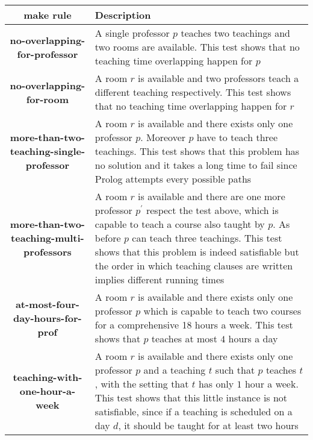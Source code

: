 \documentclass[10pt,a4paper]{article} %
\begin{document}
    \begin{table}
        \begin{tabular}{ c | p{6cm} }
            make rule & Description  \\
            \hline
            \textbf{no-overlapping-for-professor} & A single professor $p$
                teaches two teachings and two rooms are available.
                This test shows that no teaching time overlapping happen for $p$ \\
            \hline
            \textbf{no-overlapping-for-room} & A room $r$ is available and two
                professors teach a different teaching respectively.
                This test shows that no teaching time overlapping happen for $r$  \\
            \hline
            \textbf{more-than-two-teaching-single-professor} & A room $r$ is available and
                there exists only one professor $p$. Moreover $p$ have to teach three teachings.
                This test shows that this problem has no solution and it takes
                a long time to fail since Prolog attempts every possible paths \\
            \hline
            \textbf{more-than-two-teaching-multi-professors} & A room $r$ is available and
                there are one more professor $p^\prime$ respect the test above,
                which is capable to teach a course also taught by $p$.
                As before $p$ can teach three teachings.
                This test shows that this problem is indeed satisfiable but
                the order in which teaching clauses are written implies different
                running times \\
            \hline
            \textbf{at-most-four-day-hours-for-prof} & A room $r$ is available and
                there exists only one professor $p$
                which is capable to teach two courses for a comprehensive 18 hours
                a week. This test shows that $p$ teaches at most $4$ hours a day\\
            \hline
            \textbf{teaching-with-one-hour-a-week} & A room $r$ is available and
                there exists only one professor $p$ and a teaching $t$ such that
                $p$ teaches $t$, with the setting that $t$ has only $1$ hour a week.
                This test shows that this little instance is not satisfiable,
                since if a teaching is scheduled on a day $d$, it should be taught
                for at least two hours \\

\end{tabular}
\end{table}
\end{document}
